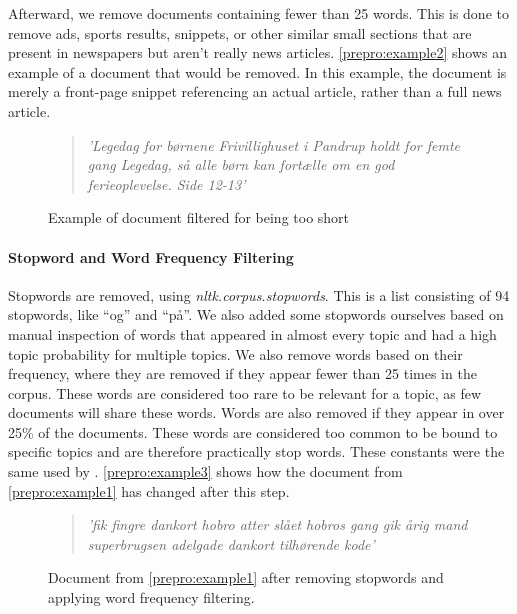 Afterward, we remove documents containing fewer than 25 words.
This is done to remove ads, sports results, snippets, or other similar small sections that are present in newspapers but aren't really news articles.
\autoref{prepro:example2} shows an example of a document that would be removed. In this example, the document is merely a front-page snippet referencing an actual article, rather than a full news article.
\begin{figure}[h]
	\begin{framed}
		\begin{quote}
			\textit{
				'Legedag for børnene Frivillighuset i Pandrup holdt for femte gang Legedag, så alle børn kan fortælle om en god ferieoplevelse. Side 12-13'
			}
		\end{quote}
	\end{framed}
	\caption{Example of document filtered for being too short}
	\label{prepro:example2}
\end{figure}


\paragraph{Stopword and Word Frequency Filtering}
Stopwords are removed, using \emph{nltk.corpus.stopwords}. 
This is a list consisting of 94 stopwords, like ``og'' and ``på''.
We also added some stopwords ourselves based on manual inspection of words that appeared in almost every topic and had a high topic probability for multiple topics.
We also remove words based on their frequency, where they are removed if they appear fewer than 25 times in the corpus.
These words are considered too rare to be relevant for a topic, as few documents will share these words.
Words are also removed if they appear in over 25\% of the documents.
These words are considered too common to be bound to specific topics and are therefore practically stop words.
These constants were the same used by \cite{quanti}.
\autoref{prepro:example3} shows how the document from \autoref{prepro:example1} has changed after this step.
\begin{figure}[h]
	\begin{framed}
		\begin{quote}
			\textit{
				'fik fingre dankort hobro atter slået hobros gang gik årig mand superbrugsen adelgade dankort tilhørende kode'
			}
		\end{quote}
	\end{framed}
	\caption{Document from \autoref{prepro:example1} after removing stopwords and applying word frequency filtering.}
	\label{prepro:example3}
\end{figure}



